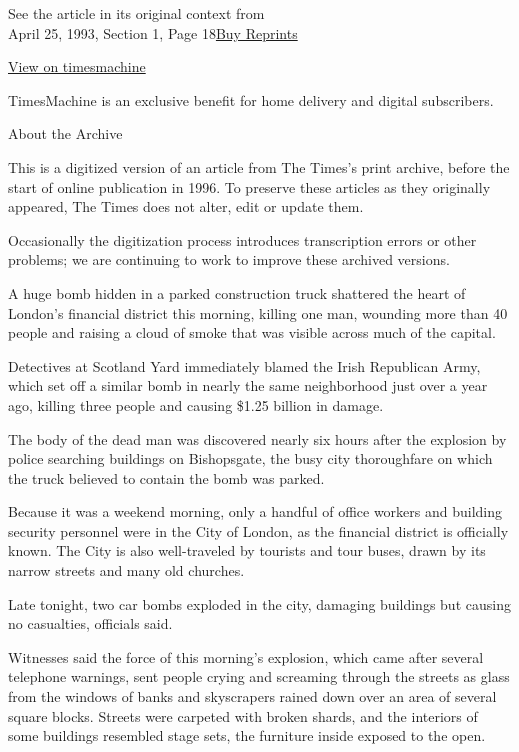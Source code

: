 See the article in its original context from\\
April 25, 1993, Section 1, Page
18\href{https://store.nytimes.com/collections/new-york-times-page-reprints?utm_source=nytimes\&utm_medium=article-page\&utm_campaign=reprints}{Buy
Reprints}

\href{http://timesmachine.nytimes.com/timesmachine/1993/04/25/578993.html}{View
on timesmachine}

TimesMachine is an exclusive benefit for home delivery and digital
subscribers.

About the Archive

This is a digitized version of an article from The Times's print
archive, before the start of online publication in 1996. To preserve
these articles as they originally appeared, The Times does not alter,
edit or update them.

Occasionally the digitization process introduces transcription errors or
other problems; we are continuing to work to improve these archived
versions.

A huge bomb hidden in a parked construction truck shattered the heart of
London's financial district this morning, killing one man, wounding more
than 40 people and raising a cloud of smoke that was visible across much
of the capital.

Detectives at Scotland Yard immediately blamed the Irish Republican
Army, which set off a similar bomb in nearly the same neighborhood just
over a year ago, killing three people and causing \$1.25 billion in
damage.

The body of the dead man was discovered nearly six hours after the
explosion by police searching buildings on Bishopsgate, the busy city
thoroughfare on which the truck believed to contain the bomb was parked.

Because it was a weekend morning, only a handful of office workers and
building security personnel were in the City of London, as the financial
district is officially known. The City is also well-traveled by tourists
and tour buses, drawn by its narrow streets and many old churches.

Late tonight, two car bombs exploded in the city, damaging buildings but
causing no casualties, officials said.

Witnesses said the force of this morning's explosion, which came after
several telephone warnings, sent people crying and screaming through the
streets as glass from the windows of banks and skyscrapers rained down
over an area of several square blocks. Streets were carpeted with broken
shards, and the interiors of some buildings resembled stage sets, the
furniture inside exposed to the open.

